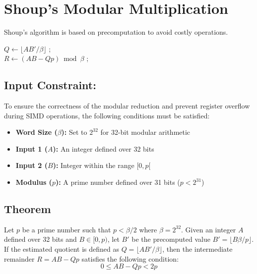 \documentclass{article}
\begin{document}
\section{Shoup's Modular Multiplication}
Shoup's algorithm is based on precomputation to avoid costly operations.

\begin{algorithm}[H]
    \caption{Shoup's modular multiplication algorithm}


    \Input{$A, B \in [0, p[$, we suppose that $p < \beta$/2 \\
    \hspace{1.2cm} precompute $B' = \lfloor B\beta/p \rfloor$}

    \BlankLine

    $Q \leftarrow \lfloor AB'/\beta \rfloor$ \quad ;\\
    $R \leftarrow (AB - Qp) \bmod \beta$ \quad ;

\end{algorithm}


\subsection{Input Constraint:}
To ensure the correctness of the modular reduction and prevent register overflow during SIMD operations,
the following conditions must be satisfied:
\begin{itemize}
    \item \textbf{Word Size ($\beta$):} Set to $2^{32}$ for 32-bit modular arithmetic
    \item \textbf{Input 1 ($A$):} An integer defined over 32 bits
    \item \textbf{Input 2 ($B$):} Integer within the range $[0, p[$
    \item \textbf{Modulus ($p$):} A prime number defined over 31 bits ($p < 2^{31}$)
\end{itemize}


\subsection{Theorem}
Let $p$ be a prime number such that $p < \beta/2$ where $\beta = 2^{32}$. Given an integer $A$ defined over 32 bits and
$B \in [0, p)$, let $B'$ be the precomputed value $B' = \lfloor B\beta/p \rfloor$.
If the estimated quotient is defined as $Q = \lfloor AB'/\beta \rfloor$, then the intermediate remainder $R = AB - Qp$ satisfies the following condition:
$$0 \le AB - Qp < 2p$$
\end{document}
